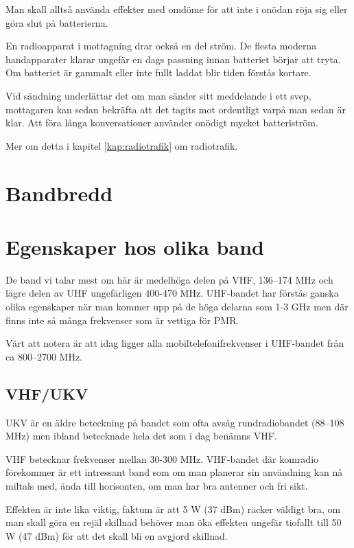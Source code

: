 Man skall alltså använda effekter med omdöme för att inte i onödan röja sig eller göra slut på batterierna.

En radioapparat i mottagning drar också en del ström. De flesta moderna handapparater klarar ungefär en dags passning innan batteriet börjar att tryta. Om batteriet är gammalt eller inte fullt laddat blir tiden förstås kortare.

Vid sändning underlättar det om man sänder sitt meddelande i ett svep, mottagaren kan sedan bekräfta att det tagits mot ordentligt varpå man sedan är klar. Att föra långa konversationer använder onödigt mycket batteriström.

Mer om detta i kapitel  \ref{kap:radiotrafik} om radiotrafik.

\section{Bandbredd}


\section{Egenskaper hos olika band}

De band vi talar mest om här är medelhöga delen på VHF, 136--174 MHz och lägre delen av UHF ungefärligen 400-470 MHz. UHF-bandet har förstås ganska olika egenskaper när man kommer upp på de höga delarna som 1-3 GHz men där finns inte så många frekvenser som är vettiga för PMR.

Värt att notera är att idag ligger alla mobiltelefonifrekvenser i UHF-bandet från ca 800--2700 MHz.

\subsection{VHF/UKV}

UKV är en äldre beteckning på bandet som ofta avsåg rundradiobandet (88--108 MHz) men ibland betecknade hela det som i dag benämns VHF.

VHF betecknar frekvenser mellan 30-300 MHz. VHF-bandet där komradio förekommer är ett intressant band som om man planerar sin användning kan nå miltals med, ända till horisonten, om man har bra antenner och fri sikt. 

Effekten är inte lika viktig, faktum är att 5 W (37 dBm) räcker väldigt bra, om man skall göra en rejäl skillnad behöver man öka effekten ungefär tiofallt till 50 W (47 dBm) för att det skall bli en avgjord skillnad. 

